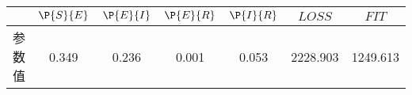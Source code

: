 \begin{tabular}{ccccccc}
\hline
&$\P{S}{E}$&$\P{E}{I}$&$\P{E}{R}$&$\P{I}{R}$&$LOSS$&$FIT$\\
\hline
参数值&0.349&0.236&0.001&0.053&2228.903&1249.613\\
\hline
\end{tabular}